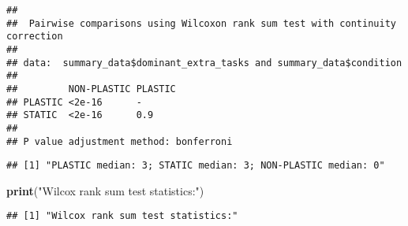 \documentclass[]{book}
\newenvironment{Shaded}{\begin{snugshade}}{\end{snugshade}}
\newcommand{\DataTypeTok}[1]{\textcolor[rgb]{0.13,0.29,0.53}{#1}}
\newcommand{\KeywordTok}[1]{\textcolor[rgb]{0.13,0.29,0.53}{\textbf{#1}}}
\newcommand{\NormalTok}[1]{#1}
\newcommand{\OperatorTok}[1]{\textcolor[rgb]{0.81,0.36,0.00}{\textbf{#1}}}
\newcommand{\StringTok}[1]{\textcolor[rgb]{0.31,0.60,0.02}{#1}}
\begin{document}
\begin{verbatim}
## 
##  Pairwise comparisons using Wilcoxon rank sum test with continuity correction 
## 
## data:  summary_data$dominant_extra_tasks and summary_data$condition 
## 
##         NON-PLASTIC PLASTIC
## PLASTIC <2e-16      -      
## STATIC  <2e-16      0.9    
## 
## P value adjustment method: bonferroni
\end{verbatim}

\begin{Shaded}
\end{Shaded}

\begin{verbatim}
## [1] "PLASTIC median: 3; STATIC median: 3; NON-PLASTIC median: 0"
\end{verbatim}

\begin{Shaded}
\begin{Highlighting}[]
\KeywordTok{print}\NormalTok{(}\StringTok{"Wilcox rank sum test statistics:"}\NormalTok{)}
\end{Highlighting}
\end{Shaded}

\begin{verbatim}
## [1] "Wilcox rank sum test statistics:"
\end{verbatim}
\end{document}
